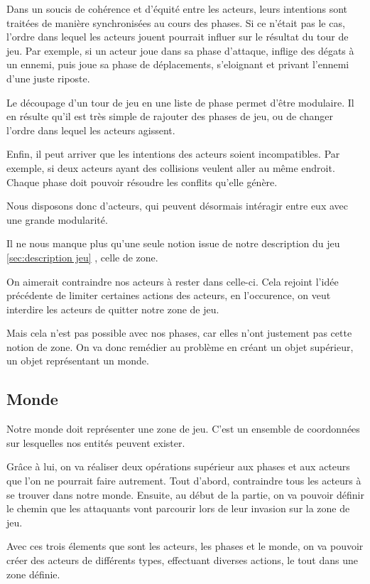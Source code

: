 \documentclass{article}
\begin{document}
Dans un soucis de cohérence et d'équité entre les acteurs, 
leurs intentions sont traitées de manière synchronisées au cours des phases.
Si ce n'était pas le cas, l'ordre dans lequel les acteurs jouent pourrait influer 
sur le résultat du tour de jeu. Par exemple, si un acteur joue dans sa 
phase d'attaque, inflige des dégats à un ennemi, puis joue sa phase de déplacements,
s'eloignant et privant l'ennemi d'une juste riposte.

Le découpage d'un tour de jeu en une liste de phase permet d'être modulaire.
Il en résulte qu'il est très simple de rajouter des phases de jeu, ou de 
changer l'ordre dans lequel les acteurs agissent.

Enfin, il peut arriver que les intentions des acteurs soient incompatibles.
Par exemple, si deux acteurs ayant des collisions veulent aller au même endroit.
Chaque phase doit pouvoir résoudre les conflits qu'elle génère.

Nous disposons donc d'acteurs, qui peuvent désormais intéragir entre eux avec 
une grande modularité.

Il ne nous manque plus qu'une seule notion issue de notre description du jeu 
\ref{sec:description jeu} , celle de zone.

On aimerait contraindre nos acteurs à rester dans celle-ci. Cela 
rejoint l'idée précédente de limiter certaines actions des acteurs, en l'occurence, 
on veut interdire les acteurs de quitter notre zone de jeu.

Mais cela n'est pas possible avec nos phases, car elles n'ont justement pas 
cette notion de zone.
On va donc remédier au problème en créant un objet supérieur, un objet représentant 
un monde.

\subsection{Monde}

Notre monde doit représenter une zone de jeu.
C'est un ensemble de coordonnées sur lesquelles nos entités peuvent exister.

Grâce à lui, on va réaliser deux opérations supérieur aux phases et aux acteurs que 
l'on ne pourrait faire autrement.
Tout d'abord, contraindre tous les acteurs à se trouver dans notre monde.
Ensuite, au début de la partie, on va pouvoir définir le chemin que 
les attaquants vont parcourir lors de leur invasion sur la zone de jeu.

Avec ces trois élements que sont les acteurs, les phases et le monde, on va pouvoir 
créer des acteurs de différents types, effectuant diverses actions, le tout dans une 
zone définie.
\end{document}
